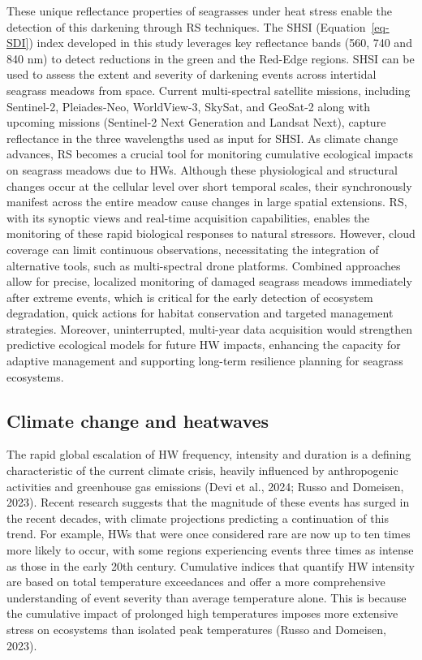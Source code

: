 \documentclass[
  letterpaper,
  11pt,
  english,
  singlespacing,
  headsepline]{MastersDoctoralThesis}
\begin{document}
\begin{spacing}{1.5}
These unique reflectance properties of seagrasses under heat stress
enable the detection of this darkening through RS techniques. The SHSI
(Equation~\ref{eq-SDI}) index developed in this study leverages key
reflectance bands (560, 740 and 840 nm) to detect reductions in the
green and the Red-Edge regions. SHSI can be used to assess the extent
and severity of darkening events across intertidal seagrass meadows from
space. Current multi-spectral satellite missions, including Sentinel-2,
Pleiades-Neo, WorldView-3, SkySat, and GeoSat-2 along with upcoming
missions (Sentinel-2 Next Generation and Landsat Next), capture
reflectance in the three wavelengths used as input for SHSI. As climate
change advances, RS becomes a crucial tool for monitoring cumulative
ecological impacts on seagrass meadows due to HWs. Although these
physiological and structural changes occur at the cellular level over
short temporal scales, their synchronously manifest across the entire
meadow cause changes in large spatial extensions. RS, with its synoptic
views and real-time acquisition capabilities, enables the monitoring of
these rapid biological responses to natural stressors. However, cloud
coverage can limit continuous observations, necessitating the
integration of alternative tools, such as multi-spectral drone
platforms. Combined approaches allow for precise, localized monitoring
of damaged seagrass meadows immediately after extreme events, which is
critical for the early detection of ecosystem degradation, quick actions
for habitat conservation and targeted management strategies. Moreover,
uninterrupted, multi-year data acquisition would strengthen predictive
ecological models for future HW impacts, enhancing the capacity for
adaptive management and supporting long-term resilience planning for
seagrass ecosystems.

\subsection{Climate change and
heatwaves}\label{climate-change-and-heatwaves}

The rapid global escalation of HW frequency, intensity and duration is a
defining characteristic of the current climate crisis, heavily
influenced by anthropogenic activities and greenhouse gas emissions
(Devi et al., 2024; Russo and Domeisen, 2023). Recent research suggests
that the magnitude of these events has surged in the recent decades,
with climate projections predicting a continuation of this trend. For
example, HWs that were once considered rare are now up to ten times more
likely to occur, with some regions experiencing events three times as
intense as those in the early 20th century. Cumulative indices that
quantify HW intensity are based on total temperature exceedances and
offer a more comprehensive understanding of event severity than average
temperature alone. This is because the cumulative impact of prolonged
high temperatures imposes more extensive stress on ecosystems than
isolated peak temperatures (Russo and Domeisen, 2023).


\end{spacing}
\end{document}
